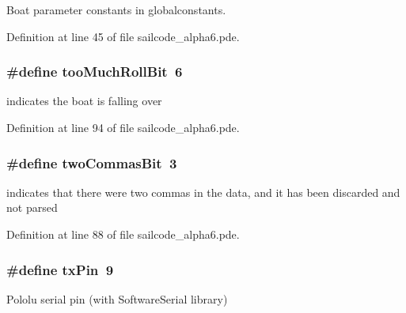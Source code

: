 \-Boat parameter constants in globalconstants. 



\-Definition at line 45 of file sailcode\-\_\-alpha6.\-pde.

\hypertarget{group__globalconstants_ga808c40e80d82d52b2ceab81282ad35ec}{
\subsubsection[{too\-Much\-Roll\-Bit}]{\setlength{\rightskip}{0pt plus 5cm}\#define too\-Much\-Roll\-Bit~6}}
\label{group__globalconstants_ga808c40e80d82d52b2ceab81282ad35ec}


indicates the boat is falling over 



\-Definition at line 94 of file sailcode\-\_\-alpha6.\-pde.

\hypertarget{group__globalconstants_gae059b25098726f37143284774ef86a07}{
\subsubsection[{two\-Commas\-Bit}]{\setlength{\rightskip}{0pt plus 5cm}\#define two\-Commas\-Bit~3}}
\label{group__globalconstants_gae059b25098726f37143284774ef86a07}


indicates that there were two commas in the data, and it has been discarded and not parsed 



\-Definition at line 88 of file sailcode\-\_\-alpha6.\-pde.

\hypertarget{group__globalconstants_ga38340aff22e726c77f9cf87b5bea10dd}{
\subsubsection[{tx\-Pin}]{\setlength{\rightskip}{0pt plus 5cm}\#define tx\-Pin~9}}
\label{group__globalconstants_ga38340aff22e726c77f9cf87b5bea10dd}


\-Pololu serial pin (with \-Software\-Serial library) 



